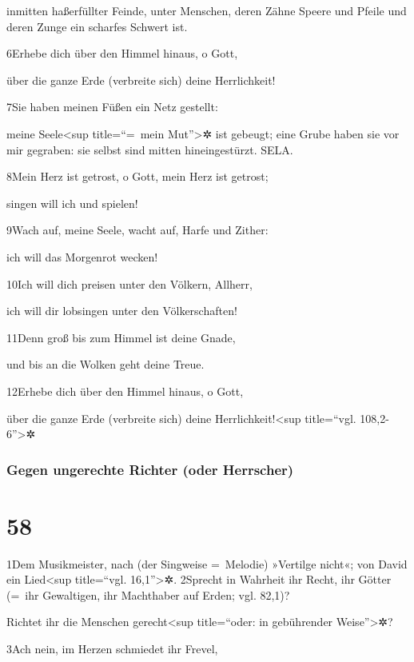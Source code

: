 inmitten haßerfüllter Feinde, unter Menschen, deren Zähne Speere und
Pfeile und deren Zunge ein scharfes Schwert ist.

6Erhebe dich über den Himmel hinaus, o Gott,

über die ganze Erde (verbreite sich) deine Herrlichkeit!

7Sie haben meinen Füßen ein Netz gestellt:

meine Seele\textless sup title=``=~mein Mut''\textgreater✲ ist gebeugt;
eine Grube haben sie vor mir gegraben: sie selbst sind mitten
hineingestürzt. SELA.

8Mein Herz ist getrost, o Gott, mein Herz ist getrost;

singen will ich und spielen!

9Wach auf, meine Seele, wacht auf, Harfe und Zither:

ich will das Morgenrot wecken!

10Ich will dich preisen unter den Völkern, Allherr,

ich will dir lobsingen unter den Völkerschaften!

11Denn groß bis zum Himmel ist deine Gnade,

und bis an die Wolken geht deine Treue.

12Erhebe dich über den Himmel hinaus, o Gott,

über die ganze Erde (verbreite sich) deine Herrlichkeit!\textless sup
title=``vgl. 108,2-6''\textgreater✲

\hypertarget{gegen-ungerechte-richter-oder-herrscher}{%
\subsubsection{Gegen ungerechte Richter (oder
Herrscher)}\label{gegen-ungerechte-richter-oder-herrscher}}

\hypertarget{section-57}{%
\section{58}\label{section-57}}

1Dem Musikmeister, nach (der Singweise =~Melodie) »Vertilge nicht«; von
David ein Lied\textless sup title=``vgl. 16,1''\textgreater✲. 2Sprecht
in Wahrheit ihr Recht, ihr Götter{ (=~ihr Gewaltigen, ihr Machthaber auf
Erden; vgl. 82,1)}?

Richtet ihr die Menschen gerecht\textless sup title=``oder: in
gebührender Weise''\textgreater✲?

3Ach nein, im Herzen schmiedet ihr Frevel,

